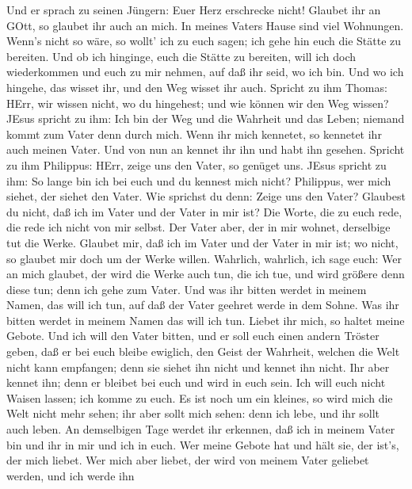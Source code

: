  Und er sprach zu seinen Jüngern: Euer Herz erschrecke
nicht! Glaubet ihr an GOtt, so glaubet ihr auch an mich.  In
meines Vaters Hause sind viel Wohnungen. Wenn's nicht so wäre, so wollt'
ich zu euch sagen; ich gehe hin euch die Stätte zu bereiten.
 Und ob ich hinginge, euch die Stätte zu bereiten, will ich
doch wiederkommen und euch zu mir nehmen, auf daß ihr seid, wo ich bin.
 Und wo ich hingehe, das wisset ihr, und den Weg wisset ihr
auch.  Spricht zu ihm Thomas: HErr, wir wissen nicht, wo du
hingehest; und wie können wir den Weg wissen?  JEsus spricht
zu ihm: Ich bin der Weg und die Wahrheit und das Leben; niemand kommt
zum Vater denn durch mich.  Wenn ihr mich kennetet, so
kennetet ihr auch meinen Vater. Und von nun an kennet ihr ihn und habt
ihn gesehen.  Spricht zu ihm Philippus: HErr, zeige uns den
Vater, so genüget uns.  JEsus spricht zu ihm: So lange bin
ich bei euch und du kennest mich nicht? Philippus, wer mich siehet, der
siehet den Vater. Wie sprichst du denn: Zeige uns den Vater?
 Glaubest du nicht, daß ich im Vater und der Vater in mir
ist? Die Worte, die zu euch rede, die rede ich nicht von mir selbst. Der
Vater aber, der in mir wohnet, derselbige tut die Werke. 
Glaubet mir, daß ich im Vater und der Vater in mir ist; wo nicht, so
glaubet mir doch um der Werke willen.  Wahrlich, wahrlich,
ich sage euch: Wer an mich glaubet, der wird die Werke auch tun, die ich
tue, und wird größere denn diese tun; denn ich gehe zum Vater.
 Und was ihr bitten werdet in meinem Namen, das will ich
tun, auf daß der Vater geehret werde in dem Sohne.  Was ihr
bitten werdet in meinem Namen das will ich tun.  Liebet ihr
mich, so haltet meine Gebote.  Und ich will den Vater
bitten, und er soll euch einen andern Tröster geben, daß er bei euch
bleibe ewiglich,  den Geist der Wahrheit, welchen die Welt
nicht kann empfangen; denn sie siehet ihn nicht und kennet ihn nicht.
Ihr aber kennet ihn; denn er bleibet bei euch und wird in euch sein.
 Ich will euch nicht Waisen lassen; ich komme zu euch.
 Es ist noch um ein kleines, so wird mich die Welt nicht
mehr sehen; ihr aber sollt mich sehen: denn ich lebe, und ihr sollt auch
leben.  An demselbigen Tage werdet ihr erkennen, daß ich in
meinem Vater bin und ihr in mir und ich in euch.  Wer meine
Gebote hat und hält sie, der ist's, der mich liebet. Wer mich aber
liebet, der wird von meinem Vater geliebet werden, und ich werde ihn
